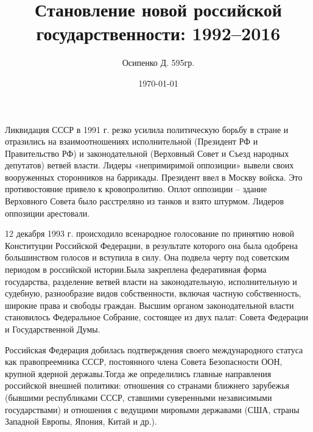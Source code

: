 \documentclass[a4paper, 12pt]{article}
\title{Становление новой российской государственности: 1992–2016}
\author{Осипенко Д. 595гр.}
\date{\today}
\begin{document}
\sffamily
\maketitle
Ликвидация СССР в 1991 г. резко усилила политическую борьбу в стране и отразились на взаимоотношениях исполнительной (Президент РФ и Правительство РФ) и законодательной (Верховный Совет и Съезд народных депутатов) ветвей власти. Лидеры «непримиримой оппозиции» вывели своих вооруженных сторонников на баррикады. Президент ввел в Москву войска. Это противостояние привело к кровопролитию. Оплот оппозиции – здание Верховного Совета было расстреляно из танков и взято штурмом. Лидеров оппозиции арестовали. 

12 декабря 1993 г. происходило всенародное голосование по принятию новой Конституции Российской Федерации, в результате которого она была одобрена большинством голосов и вступила в силу. Она подвела черту под советским периодом в российской истории.Была закреплена федеративная форма государства, разделение ветвей власти на законодательную, исполнительную и судебную, разнообразие видов собственности, включая частную собственность, широкие права и свободы граждан.  Высшим органом законодательной власти становилось Федеральное Собрание, состоящее из двух палат: Совета Федерации и Государственной Думы.

Российская Федерация добилась подтверждения своего международного статуса как правопреемника СССР, постоянного члена Совета Безопасности ООН, крупной ядерной державы.Тогда же определились главные направления российской внешней политики: отношения со странами ближнего зарубежья (бывшими республиками СССР, ставшими суверенными независимыми государствами) и отношения с ведущими мировыми державами (США, страны Западной Европы, Япония, Китай и др.).
\end{document}
